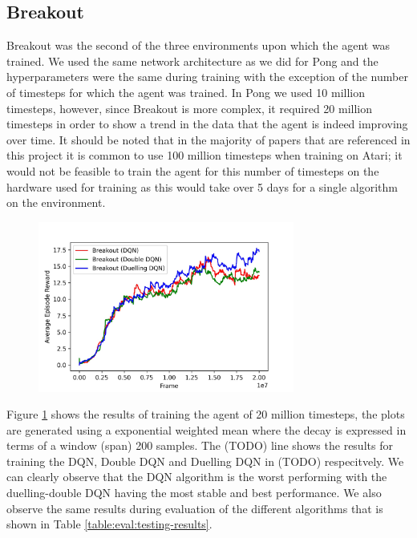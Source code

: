 \subsection{Breakout}
Breakout was the second of the three environments upon which the agent was trained. We used the same network architecture as we did for Pong and the hyperparameters were the same during training with the exception of the number of timesteps for which the agent was trained. In Pong we used 10 million timesteps, however, since Breakout is more complex, it required 20 million timesteps in order to show a trend in the data that the agent is indeed improving over time. It should be noted that in the majority of papers that are referenced in this project it is common to use 100 million timesteps when training on Atari; it would not be feasible to train the agent for this number of timesteps on the hardware used for training as this would take over 5 days for a single algorithm on the environment.

\begin{figure}[htbp]
  \centering
  \includegraphics[width=0.75\textwidth]{chapters/chapter5/images/breakout_plot.jpg}
  \caption[Breakout Training results]{
    \label{fig:breakout-train-results}
  }
\end{figure}

Figure \ref{fig:breakout-train-results} shows the results of training the agent of 20 million timesteps, the plots are generated using a exponential weighted mean where the decay is expressed in terms of a window (span) 200 samples. The (TODO) line shows the results for training the DQN, Double DQN and Duelling DQN in (TODO) respecitvely. We can clearly observe that the DQN algorithm is the worst performing with the duelling-double DQN having the most stable and best performance. We also observe the same results during evaluation of the different algorithms that is shown in Table \ref{table:eval:testing-results}.

